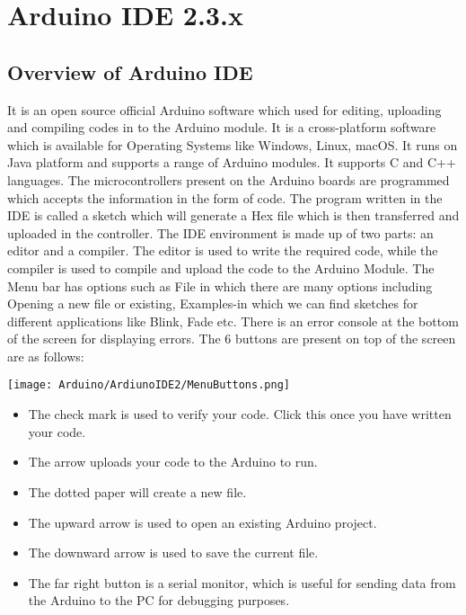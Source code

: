 %
%


\chapter{Arduino IDE 2.3.x}


    
    
\section{Overview of Arduino IDE}
	
	It is an open source official Arduino software which used for editing, uploading and compiling codes in to the Arduino module. It is a cross-platform software which is available for Operating Systems like Windows, Linux, macOS. It runs on Java platform and supports a range of Arduino modules. It supports C and C++ languages. The microcontrollers present on the Arduino boards are programmed which accepts the information in the form of code. The program written in the IDE is called a sketch which will generate a Hex file which is then transferred and uploaded in the controller. The IDE environment is made up of two parts: an editor and a compiler. The editor is used to write the required code, while the compiler is used to compile and upload the code to the Arduino Module. The Menu bar has options such as File in which there are many options including Opening a new file or existing, Examples-in which we can find sketches for different applications like Blink, Fade etc. There is an error console at the bottom of the screen for displaying errors.
	The 6 buttons are present on top of the screen are as follows:

		\begin{center}
		\texttt{[image: Arduino/ArdiunoIDE2/MenuButtons.png]}
	\end{center}
	
	
	\begin{itemize}
		\item The check mark is used to verify your code. Click this once you have written your code.
		\item The arrow uploads your code to the Arduino to run.
		\item The dotted paper will create a new file.
		\item The upward arrow is used to open an existing Arduino project.
		\item The downward arrow is used to save the current file.
		\item The far right button is a serial monitor, which is useful for sending data from the Arduino to the PC for debugging purposes.
	\end{itemize}
	
